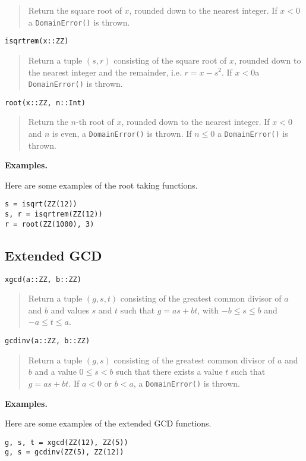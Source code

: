 \documentclass[a4paper,10pt]{article}
\newcommand{\code}{\lstinline}
\newcommand{\desc}[1]{\vspace{-3mm}\begin{quote}#1\end{quote}}
\begin{document}
{{{\desc{Return the square root of $x$, rounded down to the nearest integer. If $x < 0$
a \code{DomainError()} is thrown.}

\begin{lstlisting}
isqrtrem(x::ZZ)
\end{lstlisting}

\desc{Return a tuple $(s, r)$ consisting of the square root of $x$, rounded down to the 
nearest integer and the remainder, i.e. $r = x - s^2$. If $x < 0$a \code{DomainError()}
is thrown.}

\begin{lstlisting}
root(x::ZZ, n::Int)
\end{lstlisting}

\desc{Return the $n$-th root of $x$, rounded down to the nearest integer. If $x < 0$ and
$n$ is even, a \code{DomainError()} is thrown. If $n \leq 0$ a \code{DomainError()} is
thrown.}

\textbf{Examples.}

Here are some examples of the root taking functions.

\begin{lstlisting}
s = isqrt(ZZ(12))
s, r = isqrtrem(ZZ(12))
r = root(ZZ(1000), 3)
\end{lstlisting}

\subsection{Extended GCD}

\begin{lstlisting}
xgcd(a::ZZ, b::ZZ)
\end{lstlisting}

\desc{Return a tuple $(g, s, t)$ consisting of the greatest common divisor of $a$ and $b$
and values $s$ and $t$ such that $g = as + bt$, with $-b \leq s \leq b$ and 
$-a \leq t \leq a$.}

\begin{lstlisting}
gcdinv(a::ZZ, b::ZZ)
\end{lstlisting}

\desc{Return a tuple $(g, s)$ consisting of the greatest common divisor of $a$ and $b$
and a value $0 \leq s < b$ such that there exists a value $t$ such that 
$g = as + bt$. If $a < 0$ or $b < a$, a \code{DomainError()} is thrown.}

\textbf{Examples.}

Here are some examples of the extended GCD functions.

\begin{lstlisting}
g, s, t = xgcd(ZZ(12), ZZ(5))
g, s = gcdinv(ZZ(5), ZZ(12))
\end{lstlisting}

}}}
\end{document}
